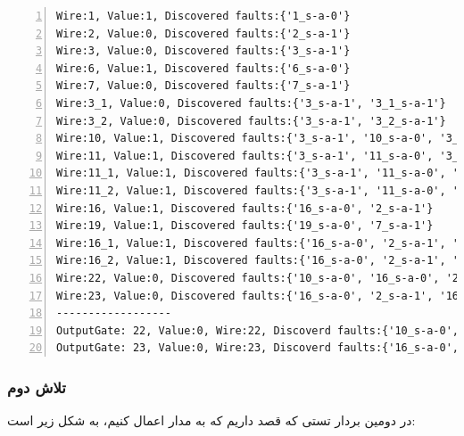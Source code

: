 \begin{latin}
\begin{lstlisting}[numbers=left, breaklines=true]
Wire:1, Value:1, Discovered faults:{'1_s-a-0'} 
Wire:2, Value:0, Discovered faults:{'2_s-a-1'} 
Wire:3, Value:0, Discovered faults:{'3_s-a-1'} 
Wire:6, Value:1, Discovered faults:{'6_s-a-0'} 
Wire:7, Value:0, Discovered faults:{'7_s-a-1'} 
Wire:3_1, Value:0, Discovered faults:{'3_s-a-1', '3_1_s-a-1'} 
Wire:3_2, Value:0, Discovered faults:{'3_s-a-1', '3_2_s-a-1'} 
Wire:10, Value:1, Discovered faults:{'3_s-a-1', '10_s-a-0', '3_1_s-a-1'} 
Wire:11, Value:1, Discovered faults:{'3_s-a-1', '11_s-a-0', '3_2_s-a-1'} 
Wire:11_1, Value:1, Discovered faults:{'3_s-a-1', '11_s-a-0', '11_1_s-a-0', '3_2_s-a-1'} 
Wire:11_2, Value:1, Discovered faults:{'3_s-a-1', '11_s-a-0', '11_2_s-a-0', '3_2_s-a-1'} 
Wire:16, Value:1, Discovered faults:{'16_s-a-0', '2_s-a-1'} 
Wire:19, Value:1, Discovered faults:{'19_s-a-0', '7_s-a-1'} 
Wire:16_1, Value:1, Discovered faults:{'16_s-a-0', '2_s-a-1', '16_1_s-a-0'} 
Wire:16_2, Value:1, Discovered faults:{'16_s-a-0', '2_s-a-1', '16_2_s-a-0'} 
Wire:22, Value:0, Discovered faults:{'10_s-a-0', '16_s-a-0', '2_s-a-1', '16_1_s-a-0', '22_s-a-1', '3_1_s-a-1', '3_s-a-1'} 
Wire:23, Value:0, Discovered faults:{'16_s-a-0', '2_s-a-1', '16_2_s-a-0', '19_s-a-0', '23_s-a-1', '7_s-a-1'} 
------------------
OutputGate: 22, Value:0, Wire:22, Discoverd faults:{'10_s-a-0', '16_s-a-0', '2_s-a-1', '16_1_s-a-0', '22_s-a-1', '3_1_s-a-1', '3_s-a-1'} 
OutputGate: 23, Value:0, Wire:23, Discoverd faults:{'16_s-a-0', '2_s-a-1', '16_2_s-a-0', '19_s-a-0', '23_s-a-1', '7_s-a-1'} 
\end{lstlisting}
\end{latin}

\subsubsection{تلاش دوم}

در دومین بردار تستی که قصد داریم که به مدار 
اعمال کنیم، به شکل زیر است: 



